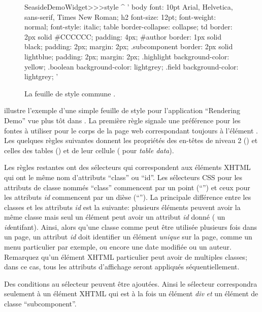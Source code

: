 \documentclass[a4paper,10pt,twoside]{book}
\begin{document}
\begin{figure}[tb]
\begin{code}{}
SeasideDemoWidget>>>style
	^ '
body {
	font: 10pt Arial, Helvetica, sans-serif, Times New Roman;
}
h2 {
	font-size: 12pt;
	font-weight: normal;
	font-style: italic;
}
table { border-collapse: collapse; }
td {
	border: 2px solid #CCCCCC;
	padding: 4px;
}
#author {
	border: 1px solid black;
	padding: 2px;
	margin: 2px;
}
.subcomponent {
	border: 2px solid lightblue;
	padding: 2px;
	margin: 2px;
}
.highlight { background-color: yellow; }
.boolean { background-color: lightgrey; }
.field { background-color: lightgrey; }
'
\end{code}
\caption{La feuille de style commune .
}
\end{figure}
 illustre l'exemple d'une simple feuille de style pour
l'application ``Rendering Demo'' vue plus tôt dans
.
La première règle signale une préférence pour les fontes à utiliser
pour le corps de la page web correspondant toujours à l'élément .
Les quelques règles suivantes donnent les propriétés des en-têtes de
niveau 2 () et celles des tables () et de leur
cellule ( pour \emph{table data}).

Les règles restantes ont des sélecteurs qui correspondent aux éléments
XHTML qui ont le même nom d'attributs ``class'' ou ``id''.
Les sélecteurs CSS pour les attributs de classe nommés ``class''
commencent par un point (``'') et ceux pour les attributs \emph{id}
commencent par un dièse (``\ct{#}'').
La principale différence entre les classes et les attributs \emph{id}
est la suivante: plusieurs éléments peuvent avoir la même classe mais
seul un élément peut avoir un attribut \emph{id} donné (\ie{} un
\emph{id}{entifant}).
Ainsi, alors qu'une classe comme  peut être utilisée
plusieurs fois dans un page, un attribut \emph{id} doit identifier un
élément \emph{unique} sur la page, comme un menu particulier par
exemple, ou encore une date modifiée ou un auteur.
Remarquez qu'un élément XHTML particulier peut avoir de multiples
classes; dans ce cas, tous les attributs d'affichage seront appliqués
séquentiellement.


Des conditions au sélecteur peuvent être ajoutées. Ainsi le sélecteur
 correspondra seulement à un élément XHTML qui
est à la fois un élément \emph{div} \emph{et} un élément de classe
``subcomponent''.
\end{document}
